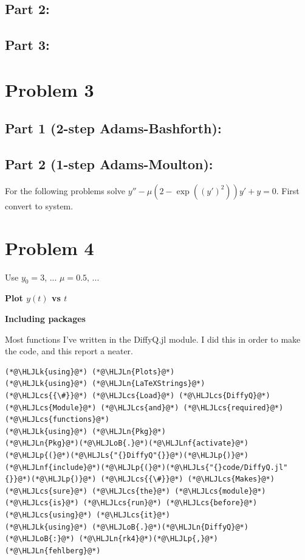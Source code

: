\documentclass[12pt,a4paper]{article}
\newcommand{\HLJLk}[1]{\textcolor[RGB]{148,91,176}{\textbf{#1}}}
\newcommand{\HLJLn}[1]{#1}
\newcommand{\HLJLnf}[1]{\textcolor[RGB]{66,102,213}{#1}}
\newcommand{\HLJLs}[1]{\textcolor[RGB]{201,61,57}{#1}}
\newcommand{\HLJLoB}[1]{\textcolor[RGB]{102,102,102}{\textbf{#1}}}
\newcommand{\HLJLp}[1]{#1}
\newcommand{\HLJLcs}[1]{\textcolor[RGB]{153,153,119}{\textit{#1}}}
\begin{document}
\subsection{Part 2:}
\subsection{Part 3:}
\section{Problem 3}
\subsection{Part 1 (2-step Adams-Bashforth):}
\subsection{Part 2 (1-step Adams-Moulton):}
For the following problems solve $y''-\mu (2-\exp((y')^2))y'+y=0$. First convert to system.

\section{Problem 4}
Use $y_0 = 3$, ... $\mu = 0.5$, ...

\textbf{Plot $y(t)$ vs $t$}

\textbf{Including packages}

Most functions I've written in the DiffyQ.jl module. I did this in order to make the code, and this report a neater. 


\begin{lstlisting}
(*@\HLJLk{using}@*) (*@\HLJLn{Plots}@*)
(*@\HLJLk{using}@*) (*@\HLJLn{LaTeXStrings}@*)
(*@\HLJLcs{{\#}}@*) (*@\HLJLcs{Load}@*) (*@\HLJLcs{DiffyQ}@*) (*@\HLJLcs{Module}@*) (*@\HLJLcs{and}@*) (*@\HLJLcs{required}@*) (*@\HLJLcs{functions}@*)
(*@\HLJLk{using}@*) (*@\HLJLn{Pkg}@*)
(*@\HLJLn{Pkg}@*)(*@\HLJLoB{.}@*)(*@\HLJLnf{activate}@*)(*@\HLJLp{(}@*)(*@\HLJLs{"{}DiffyQ"{}}@*)(*@\HLJLp{)}@*)
(*@\HLJLnf{include}@*)(*@\HLJLp{(}@*)(*@\HLJLs{"{}code/DiffyQ.jl"{}}@*)(*@\HLJLp{)}@*) (*@\HLJLcs{{\#}}@*) (*@\HLJLcs{Makes}@*) (*@\HLJLcs{sure}@*) (*@\HLJLcs{the}@*) (*@\HLJLcs{module}@*) (*@\HLJLcs{is}@*) (*@\HLJLcs{run}@*) (*@\HLJLcs{before}@*) (*@\HLJLcs{using}@*) (*@\HLJLcs{it}@*)
(*@\HLJLk{using}@*) (*@\HLJLoB{.}@*)(*@\HLJLn{DiffyQ}@*)(*@\HLJLoB{:}@*) (*@\HLJLn{rk4}@*)(*@\HLJLp{,}@*) (*@\HLJLn{fehlberg}@*)
\end{lstlisting}
\end{document}
